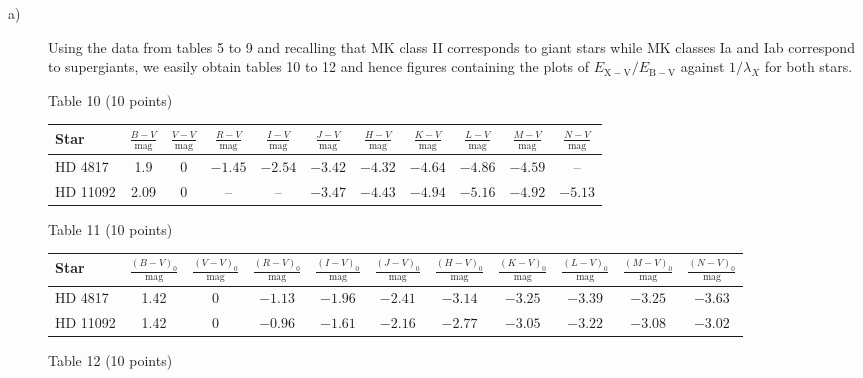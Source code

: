 \begin{description}
\item[a)] Using the data from tables 5 to 9 and recalling that MK class II
  corresponds to giant stars while MK classes Ia and Iab correspond to
  supergiants, we easily obtain tables 10 to 12 and hence figures containing
  the plots of $E_{\mathrm{X-V}}/E_{\mathrm{B-V}}$ against $1/\lambda_X$ for
  both stars.

  \begin{center}
  Table 10 (10 points)

  \begin{tabular}{|l|c|c|c|c|c|c|c|c|c|c|}
  \hline
  Star & $\frac{B-V}{\mathrm{mag}}$ & $\frac{V-V}{\mathrm{mag}}$
    & $\frac{R-V}{\mathrm{mag}}$ & $\frac{I-V}{\mathrm{mag}}$
    & $\frac{J-V}{\mathrm{mag}}$ & $\frac{H-V}{\mathrm{mag}}$
    & $\frac{K-V}{\mathrm{mag}}$ & $\frac{L-V}{\mathrm{mag}}$
    & $\frac{M-V}{\mathrm{mag}}$ & $\frac{N-V}{\mathrm{mag}}$\\
  \hline
  HD 4817 & 1.9 & 0 & $-1.45$ & $-2.54$ & $-3.42$ & $-4.32$ & $-4.64$
    & $-4.86$ & $-4.59$ & --\\
  \hline
  HD 11092 & 2.09 & 0 & -- & -- & $-3.47$ & $-4.43$ & $-4.94$ & $-5.16$
    & $-4.92$ & $-5.13$\\
  \hline
  \end{tabular}
  \end{center}

  \begin{center}
  Table 11 (10 points)

  \begin{tabular}{|l|c|c|c|c|c|c|c|c|c|c|}
  \hline
  Star & $\frac{(B-V)_0}{\mathrm{mag}}$ & $\frac{(V-V)_0}{\mathrm{mag}}$
    & $\frac{(R-V)_0}{\mathrm{mag}}$ & $\frac{(I-V)_0}{\mathrm{mag}}$
    & $\frac{(J-V)_0}{\mathrm{mag}}$ & $\frac{(H-V)_0}{\mathrm{mag}}$
    & $\frac{(K-V)_0}{\mathrm{mag}}$ & $\frac{(L-V)_0}{\mathrm{mag}}$
    & $\frac{(M-V)_0}{\mathrm{mag}}$ & $\frac{(N-V)_0}{\mathrm{mag}}$\\
  \hline
  HD 4817 & 1.42 & 0 & $-1.13$ & $-1.96$ & $-2.41$ & $-3.14$ & $-3.25$
    & $-3.39$ & $-3.25$ & $-3.63$\\
  \hline
  HD 11092 & 1.42 & 0 & $-0.96$ & $-1.61$ & $-2.16$ & $-2.77$ & $-3.05$
    & $-3.22$ & $-3.08$ & $-3.02$\\
  \hline
  \end{tabular}
  \end{center}

  \begin{center}
  Table 12 (10 points)


\end{center}
\end{description}
